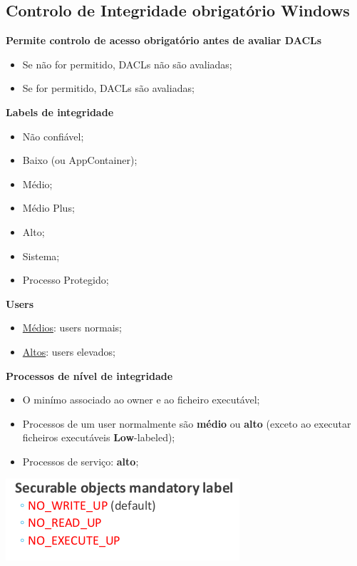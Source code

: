 \documentclass{article}
\begin{document}
\subsection{Controlo de Integridade obrigatório Windows}

\begin{flushleft}
  \textbf{Permite controlo de acesso obrigatório antes de avaliar DACLs}
  \begin{itemize}
    \item Se não for permitido, DACLs não são avaliadas;
    \item Se for permitido, DACLs são avaliadas;
  \end{itemize}

  \pagebreak

  \textbf{Labels de integridade}
  \begin{itemize}
    \item Não confiável;
    \item Baixo (ou AppContainer);
    \item Médio;
    \item Médio Plus;
    \item Alto;
    \item Sistema;
    \item Processo Protegido;
  \end{itemize}

  \vspace{2mm}

  \textbf{Users}
  \begin{itemize}
    \item \uline{Médios}: users normais;
    \item \uline{Altos}: users elevados;
  \end{itemize}

  \vspace{2mm}

  \textbf{Processos de nível de integridade}
  \begin{itemize}
    \item O minímo associado ao owner e ao ficheiro executável;
    \item Processos de um user normalmente são \textbf{médio} ou \textbf{alto} (exceto
    ao executar ficheiros executáveis \textbf{Low}-labeled);
    \item Processos de serviço: \textbf{alto};
  \end{itemize}
\end{flushleft}

\begin{center}
  \includegraphics[scale=0.4]{27}
\end{center}
\end{document}
